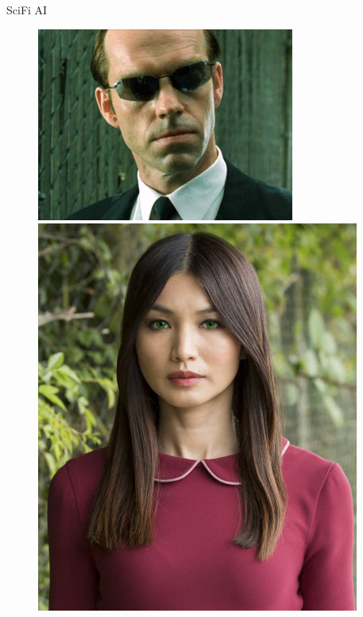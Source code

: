 \documentclass[10pt]{beamer}
\begin{document}
\begin{frame} {SciFi AI}
\begin{figure}
\begin{minipage}{.33\textwidth}
			\begin{minipage}{\textwidth}
			  \includegraphics[width=0.8 \linewidth, height=0.8 \textheight, keepaspectratio]{images/smith}
			\end{minipage}
		\end{minipage}%
		\begin{minipage}{.33\textwidth}
		  \includegraphics[width=0.8 \linewidth, height=0.8 \textheight, keepaspectratio]{images/mia}
		\end{minipage}
	\end{figure}
\end{frame}
\end{document}
